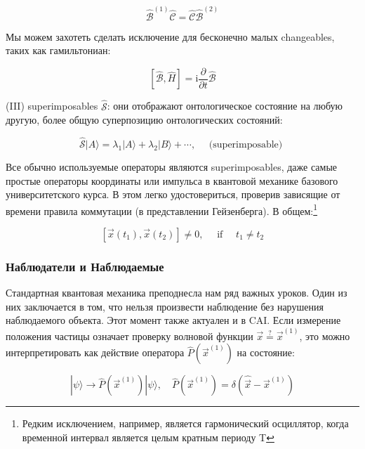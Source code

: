 \documentclass[main.tex]{subfiles}
\begin{document}
\begin{equation}\label{5.11}
	\hat{\mathcal{B}}^{(1)} \hat{\mathcal{C}} = \hat{\mathcal{C}}  \hat{\mathcal{B}}^{(2)} 
\end{equation}
       
Мы можем захотеть сделать исключение для бесконечно малых changeables, таких как гамильтониан:

\begin{equation}\label{5.12}
	[\hat{\mathcal{B}}, \hat H] = \mathrm i \frac \partial {\partial t} \hat{\mathcal{B}} 
\end{equation}
            
(III) superimposables $\hat{\mathcal{S}}$: они отображают онтологическое состояние на любую другую, более общую суперпозицию онтологических состояний:  

\begin{equation}\label{5.13}
	\hat{\mathcal{S}}|A\rangle = \lambda_{1}|A\rangle+\lambda_{2}|B\rangle+\cdots, \quad \text { (superimposable) }
\end{equation}
            
Все обычно используемые операторы являются superimposables, даже самые простые операторы координаты или импульса в квантовой механике базового университетского курса. В этом легко удостовериться, проверив зависящие от времени правила коммутации (в представлении Гейзенберга). В общем:\footnote{Редким исключением, например, является гармонический осциллятор, когда временной интервал является целым кратным периоду T}

\begin{equation}\label{5.14}
	\left[\vec{x}\left(t_{1}\right), \vec{x}\left(t_{2}\right)\right] \neq 0, \quad \text { if } \quad t_{1} \neq t_{2}
\end{equation}


\subsubsection{Наблюдатели и Наблюдаемые}\label{ch5.5.2}

Стандартная квантовая механика преподнесла нам ряд важных уроков. Один из них заключается в том, что нельзя произвести наблюдение без нарушения наблюдаемого объекта. Этот момент также актуален и в CAI. Если измерение положения частицы означает проверку волновой функции $\vec{x} \stackrel{?}{=} \vec{x}^{(1)}$, это можно интерпретировать как действие оператора $\hat P(\vec{x}^{(1)})$ на состояние:

\begin{equation}\label{5.15}
	|\psi\rangle \rightarrow \hat P\left(\vec{x}^{(1)}\right)|\psi\rangle, \quad \hat P\left(\vec{x}^{(1)}\right)=\delta\left(\hat{\vec{x}}-\vec{x}^{(1)}\right)
\end{equation}
          
\end{document}

